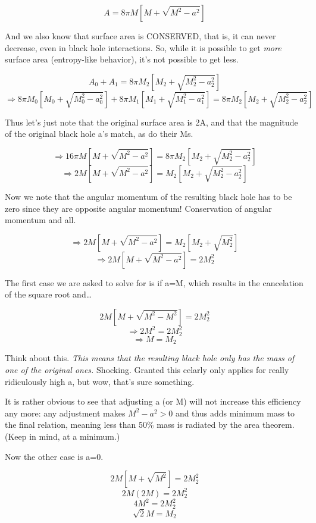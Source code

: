 \documentclass[landscape,letterpaper,10pt,english]{article}
\begin{document}
\[ A = 8\pi M \left[ M + \sqrt{M^2-a^2} \right] \]

And we also know that surface area is CONSERVED, that is, it can never
decrease, even in black hole interactions. So, while it is possible to
get \emph{more} surface area (entropy-like behavior), it's not possible
to get less.

\[ A_0+A_1 = 8\pi M_2 \left[ M_2 + \sqrt{M_2^2-a_2^2} \right] \]
\[ \Rightarrow 8\pi M_0 \left[ M_0 + \sqrt{M_0^2-a_0^2} \right]+8\pi M_1 \left[ M_1 + \sqrt{M_1^2-a_1^2} \right] = 8\pi M_2 \left[ M_2 + \sqrt{M_2^2-a_2^2} \right] \]

Thus let's just note that the original surface area is 2A, and that the
magnitude of the original black hole a's match, as do their Ms.

\[ \Rightarrow 16\pi M \left[ M + \sqrt{M^2-a^2} \right] = 8\pi M_2 \left[ M_2 + \sqrt{M_2^2-a_2^2} \right] \]
\[ \Rightarrow 2 M \left[ M + \sqrt{M^2-a^2} \right] = M_2 \left[ M_2 + \sqrt{M_2^2-a_2^2} \right] \]

Now we note that the angular momentum of the resulting black hole has to
be zero since they are opposite angular momentum! Conservation of
angular momentum and all.

\[ \Rightarrow 2 M \left[ M + \sqrt{M^2-a^2} \right] = M_2 \left[ M_2 + \sqrt{M_2^2} \right] \]
\[ \Rightarrow 2 M \left[ M + \sqrt{M^2-a^2} \right] = 2M_2^2 \]

    The first case we are asked to solve for is if \textbar a\textbar=M,
which results in the cancelation of the square root and\ldots{}

\[ 2 M \left[ M + \sqrt{M^2-M^2} \right] = 2M_2^2 \]
\[ \Rightarrow 2 M^2 = 2M_2^2 \] \[ \Rightarrow M = M_2 \]

Think about this. \emph{This means that the resulting black hole only
has the mass of one of the original ones.} Shocking. Granted this
celarly only applies for really ridiculously high a, but wow, that's
sure something.

It is rather obvious to see that adjusting a (or M) will not increase
this efficiency any more: any adjustment makes \(M^2-a^2 > 0\) and thus
adds minimum mass to the final relation, meaning less than 50\% mass is
radiated by the area theorem. (Keep in mind, at a minimum.)

    Now the other case is a=0.

\[ 2 M \left[ M + \sqrt{M^2} \right] = 2M_2^2 \]
\[ 2 M ( 2M) = 2M_2^2 \] \[ 4 M^2 = 2M_2^2 \] \[ \sqrt{2}M = M_2 \]
\end{document}
